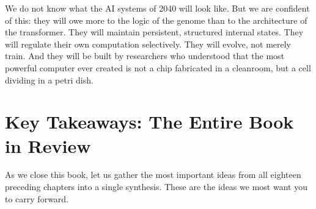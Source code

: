 We do not know what the AI systems of 2040 will look like. But we are confident of this: they will owe more to the logic of the genome than to the architecture of the transformer. They will maintain persistent, structured internal states. They will regulate their own computation selectively. They will evolve, not merely train. And they will be built by researchers who understood that the most powerful computer ever created is not a chip fabricated in a cleanroom, but a cell dividing in a petri dish.

\section{Key Takeaways: The Entire Book in Review}
\label{sec:book-takeaways}

As we close this book, let us gather the most important ideas from all eighteen preceding chapters into a single synthesis. These are the ideas we most want you to carry forward.


